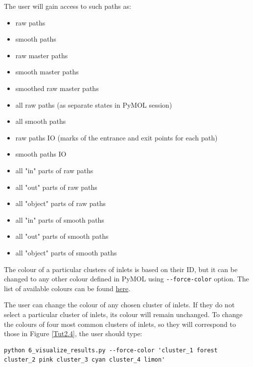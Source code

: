 \documentclass[9pt,tutorial]{livecoms}
\begin{document}
The user will gain access to such paths as:
\begin{itemize}
\item raw paths
\item smooth paths
\item raw master paths
\item smooth master paths
\item smoothed raw master paths
\item all raw paths (as separate states in PyMOL session)
\item all smooth paths
\item raw paths IO (marks of the entrance and exit points for each path)
\item smooth paths IO
\item all "in" parts of raw paths
\item all "out" parts of raw paths
\item all "object" parts of raw paths
\item all "in" parts of smooth paths
\item all "out" parts of smooth paths
\item all "object" parts of smooth paths
\end{itemize}

The colour of a particular clusters of inlets is based on their ID, but it can be changed to any other colour defined in PyMOL using \texttt{-{}-force-color} option. The list of available colours can be found \href{https://pymolwiki.org/index.php/Color_Values#Interactive_menu_colours}{here}.

The user can change the colour of any chosen cluster of inlets. If they do not select a particular cluster of inlets, its colour will remain unchanged. To change the colours of four most common clusters of inlets, so they will correspond to those in Figure \ref{Tut2.4}, the user should type:
\begin{lstlisting}
python 6_visualize_results.py --force-color 'cluster_1 forest cluster_2 pink cluster_3 cyan cluster_4 limon'
\end{lstlisting}
\end{document}
